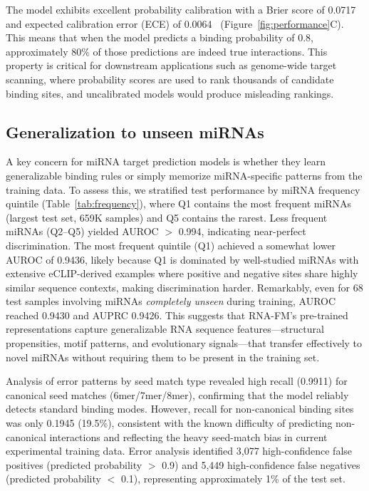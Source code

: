 \documentclass[10pt,a4paper]{article}
\begin{document}
The model exhibits excellent probability calibration with a Brier score of 0.0717 and expected calibration error (ECE) of 0.0064~\citep{naeini2015ece} (Figure~\ref{fig:performance}C). This means that when the model predicts a binding probability of 0.8, approximately 80\% of those predictions are indeed true interactions. This property is critical for downstream applications such as genome-wide target scanning, where probability scores are used to rank thousands of candidate binding sites, and uncalibrated models would produce misleading rankings.

\subsection{Generalization to unseen miRNAs}

A key concern for miRNA target prediction models is whether they learn generalizable binding rules or simply memorize miRNA-specific patterns from the training data. To assess this, we stratified test performance by miRNA frequency quintile (Table~\ref{tab:frequency}), where Q1 contains the most frequent miRNAs (largest test set, 659K samples) and Q5 contains the rarest. Less frequent miRNAs (Q2--Q5) yielded AUROC $>$ 0.994, indicating near-perfect discrimination. The most frequent quintile (Q1) achieved a somewhat lower AUROC of 0.9436, likely because Q1 is dominated by well-studied miRNAs with extensive eCLIP-derived examples where positive and negative sites share highly similar sequence contexts, making discrimination harder. Remarkably, even for 68 test samples involving miRNAs \textit{completely unseen} during training, AUROC reached 0.9430 and AUPRC 0.9426. This suggests that RNA-FM's pre-trained representations capture generalizable RNA sequence features---structural propensities, motif patterns, and evolutionary signals---that transfer effectively to novel miRNAs without requiring them to be present in the training set.

Analysis of error patterns by seed match type revealed high recall (0.9911) for canonical seed matches (6mer/7mer/8mer), confirming that the model reliably detects standard binding modes. However, recall for non-canonical binding sites was only 0.1945 (19.5\%), consistent with the known difficulty of predicting non-canonical interactions and reflecting the heavy seed-match bias in current experimental training data. Error analysis identified 3{,}077 high-confidence false positives (predicted probability $>$ 0.9) and 5{,}449 high-confidence false negatives (predicted probability $<$ 0.1), representing approximately 1\% of the test set.
\end{document}
